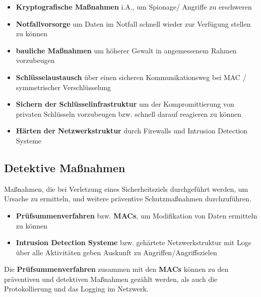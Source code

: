 \begin{itemize}
    \itemsep0.5em
    \item \textbf{Kryptografische Maßnahmen} i.A., um Spionage/ Angriffe zu erschweren
    \item \textbf{Notfallvorsorge} um Daten im Notfall schnell wieder zur Verfügung stellen zu können
    \item \textbf{bauliche Maßnahmen} um höherer Gewalt in angemessenem Rahmen vorzubeugen
    \item \textbf{Schlüsselaustausch} über einen sicheren Kommunikationsweg bei MAC / symmetrischer Verschlüsselung
    \item \textbf{Sichern der Schlüsselinfrastruktur} um der Kompromittierung von privaten Schlüsseln vorzubeugen bzw. schnell darauf reagieren zu können
    \item \textbf{Härten der Netzwerkstruktur} durch Firewalls und Intrusion Detection Systeme
\end{itemize}

\subsection*{Detektive Maßnahmen}

Maßnahmen, die bei Verletzung eines Sicherheitsziels durchgeführt werden, um Ursache zu ermitteln, und weitere präventive Schutzmaßnahmen durchzuführen.

\begin{itemize}
    \item \textbf{Prüfsummenverfahren} bzw. \textbf{MACs}, um Modifikation von Daten ermitteln zu können
    \item \textbf{Intrusion Detection Systeme} bzw. gehärtete Netzwerkstruktur mit Logs über alle Aktivitäten geben Auskunft zu Angriffen/Angriffszielen
\end{itemize}

\noindent
Die \textbf{Prüfsummenverfahren} zusammen mit den \textbf{MACs} können zu den präventiven und detektiven Maßnahmen gezählt werden, als auch die Protokollierung und das Logging im Netzwerk.